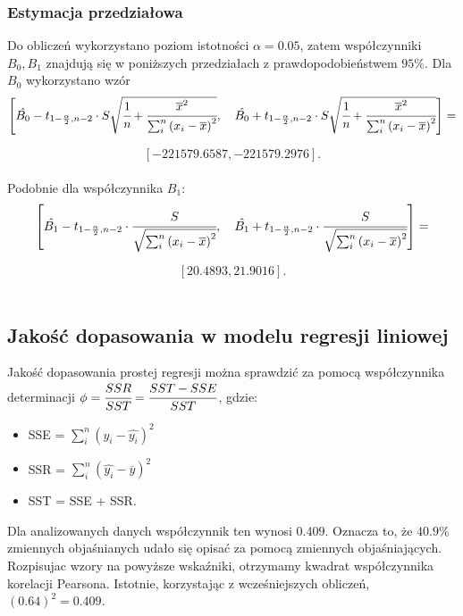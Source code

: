 \documentclass{article}
\begin{document}
\subsubsection{Estymacja przedziałowa}
Do obliczeń wykorzystano poziom istotności $\alpha = 0.05$, zatem współczynniki $B_0,B_1$ znajdują się w poniższych przedziałach z prawdopodobieństwem $95\%$. Dla $B_0$ wykorzystano wzór
$$\left[\hat{B_0} - t_{1-\frac{\alpha}{2},n-2} \cdot S \sqrt{ \cfrac{1}{n} +\cfrac{{\overline{x}}^2}{\sum_i^n {\left( x_i - \overline{x} \right) }^2}}, \quad
\hat{B_0}+ t_{1-\frac{\alpha}{2},n-2} \cdot S \sqrt{ \cfrac{1}{n} +\cfrac{{\overline{x}}^2}{\sum_i^n {\left( x_i - \overline{x} \right) }^2}} \right] =$$

$$\left[ -221579.6587, -221579.2976 \right] .$$ \\


Podobnie dla współczynnika $B_1$:
$$\left[\hat{B_1} - t_{1-\frac{\alpha}{2},n-2} \cdot \cfrac{S}{\sqrt{\sum_i^n {\left( x_i - \overline{x} \right) }^2}}, 
\quad
\hat{B_1}+ t_{1-\frac{\alpha}{2},n-2} \cdot \cfrac{S}{\sqrt{\sum_i^n {\left( x_i - \overline{x} \right) }^2}} \right] =$$

$$\left[ 20.4893, 21.9016\right].$$ \\ 
 
\subsection{Jakość dopasowania w modelu regresji liniowej}
Jakość dopasowania prostej regresji można sprawdzić za pomocą współczynnika determinacji $\phi = \cfrac{SSR}{SST} = \cfrac{SST-SSE}{SST}$, gdzie:
\begin{itemize}
    \item SSE = $\sum_i^n {\left( y_i - \hat{y_i} \right)}^2$
    \item SSR = $\sum_i^n {\left( \hat{y_i} - \overline{y} \right)}^2$
    \item SST = SSE + SSR.
\end{itemize}
Dla analizowanych danych współczynnik ten wynosi $0.409$. Oznacza to, że $40.9\%$ zmiennych objaśnianych udało się opisać za pomocą zmiennych objaśniających.
Rozpisujac wzory na powyższe wskaźniki, otrzymamy kwadrat współczynnika korelacji Pearsona. Istotnie, korzystając z wcześniejszych obliczeń, ${\left( 0.64 \right)}^2 = 0.409$.
\end{document}
